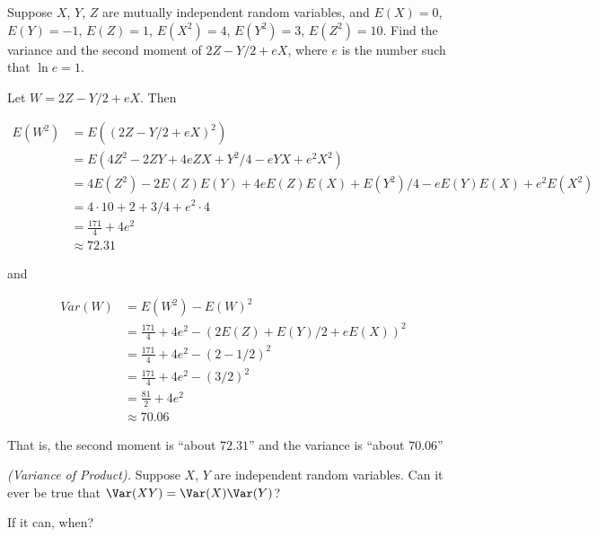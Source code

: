 \begin{problem}[Handout 9, \# 3]
  Suppose \(X\), \(Y\), \(Z\) are mutually independent random variables,
  and \(E(X)=0\), \(E(Y)=-1\), \(E(Z)=1\), \(E(X^2)=4\), \(E(Y^2)=3\),
  \(E(Z^2)=10\). Find the variance and the second moment of \(2Z-Y/2+e X\),
  where \(e\) is the number such that \(\ln e=1\).
\end{problem}
\begin{solution}

Let $W = 2Z-Y/2+e X$. Then

\begin{align*}
E(W^2) &= E((2Z-Y/2+e X)^2)\\
&= E(4Z^2 -2ZY + 4eZX + Y^2/4 -eYX + e^2X^2)\\
&= 4E(Z^2) -2E(Z)E(Y) + 4eE(Z)E(X) + E(Y^2)/4 -eE(Y)E(X) + e^2E(X^2)\\
&= 4\cdot 10 + 2  + 3/4  + e^2\cdot 4\\
&= \frac{171}{4} + 4e^2\\
&\approx 72.31
\end{align*}

and

\begin{align*}
Var(W) &= E(W^2) - E(W)^2 \\
&= \frac{171}{4} + 4e^2 - (2E(Z) + E(Y)/2 +eE(X))^2\\
&= \frac{171}{4} + 4e^2 - (2 -1/2)^2\\
&= \frac{171}{4} + 4e^2 - (3/2)^2\\
&= \frac{81}{2} +4e^2\\
&\approx 70.06
\end{align*}

That is, the second moment is ``about $72.31$'' and the variance is ``about
$70.06$''

\end{solution}
\newpage

\begin{problem}[Handout 9, \# 14]
  \emph{(Variance of Product).} Suppose \(X\), \(Y\) are independent
  random variables. Can it ever be true that \(\Var(XY)=\Var(X)\Var(Y)\)?

  \noindent If it can, when?
\end{problem}
\begin{solution}

\end{solution}

